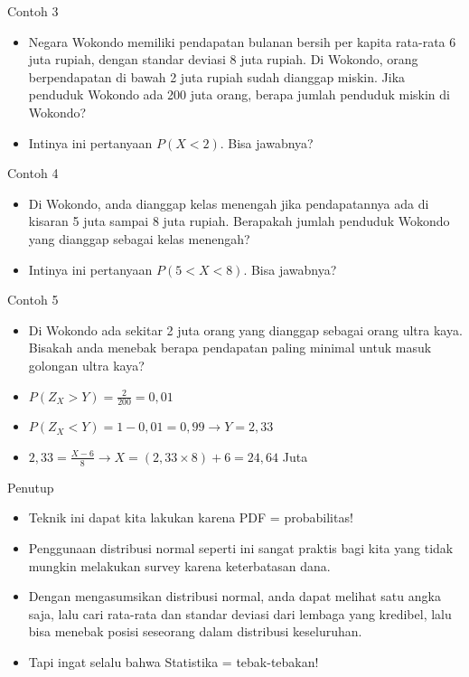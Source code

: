 \documentclass[
  ignorenonframetext,
]{beamer}
\begin{document}
\begin{frame}{Contoh 3}
\label{contoh-3-1}
\begin{itemize}
\item
  Negara Wokondo memiliki pendapatan bulanan bersih per kapita rata-rata
  6 juta rupiah, dengan standar deviasi 8 juta rupiah. Di Wokondo, orang
  berpendapatan di bawah 2 juta rupiah sudah dianggap miskin. Jika
  penduduk Wokondo ada 200 juta orang, berapa jumlah penduduk miskin di
  Wokondo?
\item
  Intinya ini pertanyaan \(P(X<2)\). Bisa jawabnya?
\end{itemize}
\end{frame}

\begin{frame}{Contoh 4}
\label{contoh-4-1}
\begin{itemize}
\item
  Di Wokondo, anda dianggap kelas menengah jika pendapatannya ada di
  kisaran 5 juta sampai 8 juta rupiah. Berapakah jumlah penduduk Wokondo
  yang dianggap sebagai kelas menengah?
\item
  Intinya ini pertanyaan \(P(5<X<8)\). Bisa jawabnya?
\end{itemize}
\end{frame}

\begin{frame}{Contoh 5}
\label{contoh-5-1}
\begin{itemize}
\item
  Di Wokondo ada sekitar 2 juta orang yang dianggap sebagai orang ultra
  kaya. Bisakah anda menebak berapa pendapatan paling minimal untuk
  masuk golongan ultra kaya?
\item
  \(P(Z_X > Y) = \frac{2}{200}=0,01\)
\item
  \(P(Z_X < Y) = 1-0,01=0,99 \rightarrow Y=2,33\)
\item
  \(2,33=\frac{X-6}{8} \rightarrow X=(2,33 \times 8 ) + 6 = 24,64\) Juta
\end{itemize}
\end{frame}

\begin{frame}{Penutup}
\label{penutup}
\begin{itemize}
\item
  Teknik ini dapat kita lakukan karena PDF = probabilitas!
\item
  Penggunaan distribusi normal seperti ini sangat praktis bagi kita yang
  tidak mungkin melakukan survey karena keterbatasan dana.
\item
  Dengan mengasumsikan distribusi normal, anda dapat melihat satu angka
  saja, lalu cari rata-rata dan standar deviasi dari lembaga yang
  kredibel, lalu bisa menebak posisi seseorang dalam distribusi
  keseluruhan.
\item
  Tapi ingat selalu bahwa Statistika = tebak-tebakan!
\end{itemize}
\end{frame}
\end{document}
